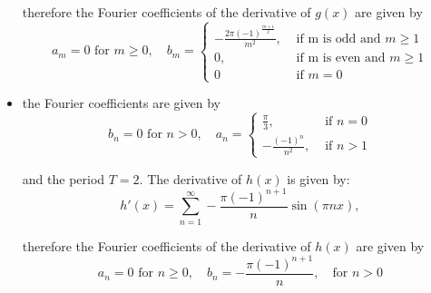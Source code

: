 \documentclass[11pt]{article}
\begin{document}
\begin{solution}
\begin{itemize}
    therefore the Fourier coefficients of the derivative of $g(x)$ are given by 
    \[
    a_m = 0 \text{ for } m \geq 0, \quad b_m = \begin{cases}-\frac{2\pi (-1)^{\frac{m+1}{2}}}{m^2}, & \text { if m is odd and }m \geq 1 \\ 0, & \text{ if m is even and } m \geq 1\\ 0 & \text{ if } m = 0  \end{cases} 
    \]
    \item 
    the Fourier coefficients are given by 
    \[
    b_n = 0 \text{ for } n >0, \quad a_n = \begin{cases}\frac{\pi}{3}, & \text { if }n = 0 \\ -\frac{(-1)^n}{n^2}, & \text{ if } n > 1 \end{cases} 
    \]

    and the period $T = 2$. The derivative of $h(x)$ is given by:
    \[
    h'(x) =\sum_{n=1}^{\infty} -\frac{\pi(-1)^{n+1}}{n}\sin(\pi n x),
    \]

    therefore the Fourier coefficients of the derivative of $h(x)$ are given by 
    \[
    a_n = 0 \text{ for } n \geq 0, \quad b_n = -\frac{\pi(-1)^{n+1}}{n},\quad \text{for }n > 0
    \]
    \end{itemize}
\end{solution}
\end{document}
